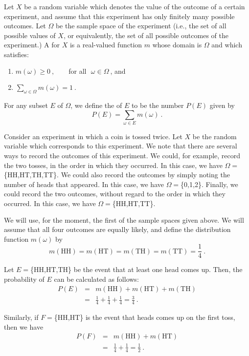 \begin{definition}\label{def 1.2} 
\leanok
Let $X$ be a random variable which denotes the value of the outcome of a certain experiment,
and assume that this experiment has only finitely many possible outcomes.  Let $\Omega$ be the
sample space of the experiment (i.e., the set of all possible values of $X$, or equivalently,
the set of all possible outcomes of the experiment.)  A  for $X$ is a real-valued
function $m$ whose domain is $\Omega$ and which satisfies:
\begin{enumerate}
\item $m(\omega) \geq 0\ , \qquad$for all $\,\,\omega\in\Omega\ $, and  
\medbreak
\item $\sum\limits_{\omega \in \Omega} m(\omega) = 1\ $.  
\end{enumerate}
For any subset $E$ of $\Omega$, we define the 
of
$E$ to be the number $P(E)$ given by
$$
P(E) = \sum_{\omega\in E} m(\omega)\ .
$$
\end{definition}
 
\begin{example}\label{exam 1.6}
\leanok
Consider an experiment in which a coin is tossed twice.  Let $X$ be the random variable which
corresponds to this experiment.  We note that there are several ways to record the outcomes of
this experiment.  We could, for example, record the two tosses, in the order in which they
occurred.  In this case, we have $\Omega = $\{HH,HT,TH,TT\}.  We could also record the outcomes
by simply noting the number of heads that appeared.  In this case, we have $\Omega =
$\{0,1,2\}.  Finally, we could record the two outcomes, without regard to the order in
which they occurred.  In this case, we have $\Omega = $\{HH,HT,TT\}.
\par
We will use, for the moment, the first of the sample spaces given above.  We will assume that
all four outcomes are equally likely, and define the distribution function $m(\omega)$ by
$$
m(\mbox{HH}) = m(\mbox{HT}) = m(\mbox{TH}) = m(\mbox{TT}) = \frac14\ .
$$
\par
Let $E = $\{HH,HT,TH\} be the event that at least one head comes up.  Then, the probability
of $E$ can be calculated as follows: 
\begin{eqnarray*}
P(E) &=& m(\mbox{HH}) + m(\mbox{HT}) + m(\mbox{TH}) \\
     &=& \frac14 + \frac14 + \frac14 = \frac34\ .
\end{eqnarray*}

Similarly, if $F = $\{HH,HT\} is the event that heads comes up on the first toss, then we have
\begin{eqnarray*}
P(F) &=& m(\mbox{HH}) + m(\mbox{HT}) \\
     &=& \frac14 + \frac14 = \frac12\ .
\end{eqnarray*}
\end{example}
 
